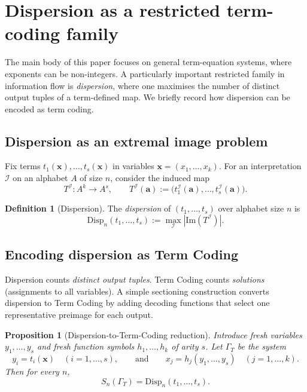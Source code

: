 \documentclass[11pt]{article}
\theoremstyle{plain}
\newtheorem{proposition}[theorem]{Proposition}
\theoremstyle{definition}
\theoremstyle{definition}
\newtheorem{definition}[theorem]{Definition}
\theoremstyle{remark}
\newcommand{\A}{A}
\newcommand{\Sn}{S_n}
\newcommand{\abs}[1]{\left\lvert #1 \right\rvert}
\begin{document}
\section{Dispersion as a restricted term-coding family}
\label{sec:dispersion}

The main body of this paper focuses on general term-equation systems, where exponents can be non-integers.
A particularly important restricted family in information flow is \emph{dispersion}, where one maximises the
number of distinct output tuples of a term-defined map.
We briefly record how dispersion can be encoded as term coding.

\subsection{Dispersion as an extremal image problem}

Fix terms $t_1(\mathbf x),\dots,t_s(\mathbf x)$ in variables $\mathbf x=(x_1,\dots,x_k)$.
For an interpretation $\mathcal I$ on an alphabet $\A$ of size $n$, consider the induced map
\[
T^{\mathcal I}:\A^k\to \A^s,\qquad
T^{\mathcal I}(\mathbf a):=\bigl(t_1^{\mathcal I}(\mathbf a),\dots,t_s^{\mathcal I}(\mathbf a)\bigr).
\]

\begin{definition}[Dispersion]
\label{def:dispersion}
The \emph{dispersion} of $(t_1,\dots,t_s)$ over alphabet size $n$ is
\[
\mathrm{Disp}_n(t_1,\dots,t_s):=\max_{\mathcal I}\abs{\mathrm{Im}(T^{\mathcal I})}.
\]
\end{definition}

\subsection{Encoding dispersion as Term Coding}

Dispersion counts \emph{distinct output tuples}. Term Coding counts \emph{solutions} (assignments to all
variables). A simple sectioning construction converts dispersion to Term Coding by adding decoding functions that select one
representative preimage for each output.

\begin{proposition}[Dispersion-to-Term-Coding reduction]
\label{prop:disp-to-tc}
Introduce fresh variables $y_1,\dots,y_s$ and fresh function symbols $h_1,\dots,h_k$ of arity $s$.
Let $\Gamma_T$ be the system
\[
  y_i=t_i(\mathbf x)\quad (i=1,\dots,s),
  \qquad\text{and}\qquad
  x_j=h_j(y_1,\dots,y_s)\quad (j=1,\dots,k).
\]
Then for every $n$,
\[\Sn(\Gamma_T)=\mathrm{Disp}_n(t_1,\dots,t_s).\]
\end{proposition}
\end{document}
